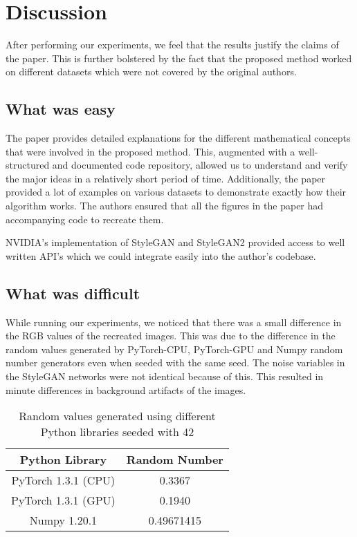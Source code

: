 \section{Discussion}

After performing our experiments, we feel that the results justify the claims of the paper. This is further bolstered by the fact that the proposed method worked on different datasets which were not covered by the original authors.

\subsection{What was easy}

The paper provides detailed explanations for the different mathematical concepts that were involved in the proposed method. This, augmented with a well-structured and documented code repository, allowed us to understand and verify the major ideas in a relatively short period of time. Additionally, the paper provided a lot of examples on various datasets to demonstrate exactly how their algorithm works. The authors ensured that all the figures in the paper had accompanying code to recreate them.

NVIDIA's implementation of StyleGAN and StyleGAN2 provided access to well written API's which we could integrate easily into the author's codebase.

\subsection{What was difficult}

While running our experiments, we noticed that there was a small difference in the RGB values of the recreated images. This was due to the difference in the random values generated by PyTorch-CPU, PyTorch-GPU and Numpy random number generators even when seeded with the same seed. The noise variables in the StyleGAN networks were not identical because of this. This resulted in minute differences in background artifacts of the images.

\begin{table}[H]
\centering
\begin{tabular}{cc}
\hline
Python Library & Random Number \\ \hline
PyTorch 1.3.1 (CPU)     & 0.3367                 \\
PyTorch 1.3.1 (GPU)     & 0.1940                 \\ 
Numpy 1.20.1            & 0.49671415             \\ \hline
\end{tabular}
\caption{Random values generated using different Python libraries seeded with 42}
\end{table}

